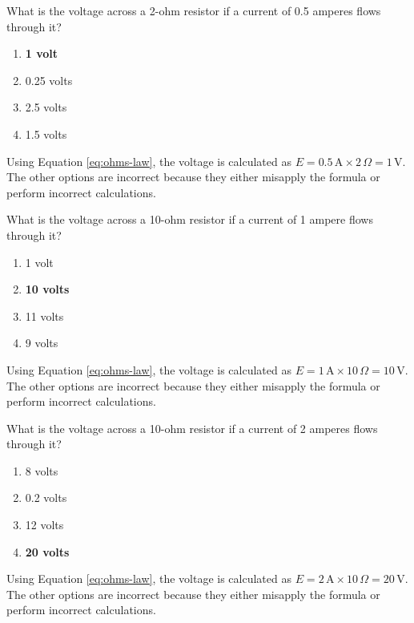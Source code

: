 \begin{tcolorbox}[colback=gray!10!white,colframe=black!75!black,title={T5D10}]
    What is the voltage across a 2-ohm resistor if a current of 0.5 amperes flows through it?
    \begin{enumerate}[label=\Alph*),noitemsep]
        \item \textbf{1 volt}
        \item 0.25 volts
        \item 2.5 volts
        \item 1.5 volts
    \end{enumerate}
\end{tcolorbox}
Using Equation \ref{eq:ohms-law}, the voltage is calculated as \(E = 0.5\,\text{A} \times 2\,\Omega = 1\,\text{V}\). The other options are incorrect because they either misapply the formula or perform incorrect calculations.

\begin{tcolorbox}[colback=gray!10!white,colframe=black!75!black,title={T5D11}]
    What is the voltage across a 10-ohm resistor if a current of 1 ampere flows through it?
    \begin{enumerate}[label=\Alph*),noitemsep]
        \item 1 volt
        \item \textbf{10 volts}
        \item 11 volts
        \item 9 volts
    \end{enumerate}
\end{tcolorbox}
Using Equation \ref{eq:ohms-law}, the voltage is calculated as \(E = 1\,\text{A} \times 10\,\Omega = 10\,\text{V}\). The other options are incorrect because they either misapply the formula or perform incorrect calculations.

\begin{tcolorbox}[colback=gray!10!white,colframe=black!75!black,title={T5D12}]
    What is the voltage across a 10-ohm resistor if a current of 2 amperes flows through it?
    \begin{enumerate}[label=\Alph*),noitemsep]
        \item 8 volts
        \item 0.2 volts
        \item 12 volts
        \item \textbf{20 volts}
    \end{enumerate}
\end{tcolorbox}
Using Equation \ref{eq:ohms-law}, the voltage is calculated as \(E = 2\,\text{A} \times 10\,\Omega = 20\,\text{V}\). The other options are incorrect because they either misapply the formula or perform incorrect calculations.

